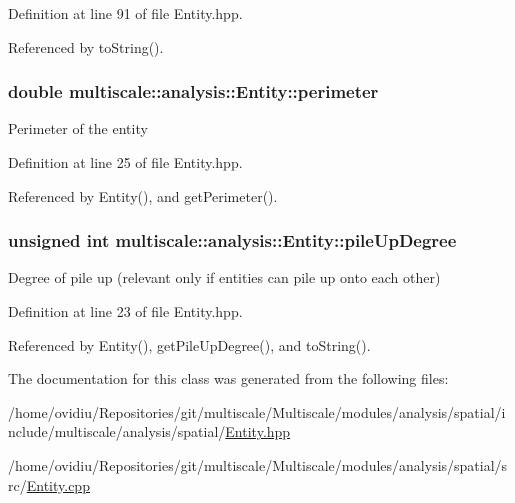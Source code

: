 \-Definition at line 91 of file \-Entity.\-hpp.



\-Referenced by to\-String().

\hypertarget{classmultiscale_1_1analysis_1_1Entity_ac7bcdb1cb5eb4369ca8e44d3dbda44a3}{
\subsubsection[{perimeter}]{\setlength{\rightskip}{0pt plus 5cm}double {\bf multiscale\-::analysis\-::\-Entity\-::perimeter}}}\label{classmultiscale_1_1analysis_1_1Entity_ac7bcdb1cb5eb4369ca8e44d3dbda44a3}
\-Perimeter of the entity 

\-Definition at line 25 of file \-Entity.\-hpp.



\-Referenced by \-Entity(), and get\-Perimeter().

\hypertarget{classmultiscale_1_1analysis_1_1Entity_aae78866cef9fcb7bd2e858570f47d082}{
\subsubsection[{pile\-Up\-Degree}]{\setlength{\rightskip}{0pt plus 5cm}unsigned int {\bf multiscale\-::analysis\-::\-Entity\-::pile\-Up\-Degree}}}\label{classmultiscale_1_1analysis_1_1Entity_aae78866cef9fcb7bd2e858570f47d082}
\-Degree of pile up (relevant only if entities can pile up onto each other) 

\-Definition at line 23 of file \-Entity.\-hpp.



\-Referenced by \-Entity(), get\-Pile\-Up\-Degree(), and to\-String().



\-The documentation for this class was generated from the following files\-:\begin{DoxyCompactItemize}
\item 
/home/ovidiu/\-Repositories/git/multiscale/\-Multiscale/modules/analysis/spatial/include/multiscale/analysis/spatial/\hyperlink{Entity_8hpp}{\-Entity.\-hpp}\item 
/home/ovidiu/\-Repositories/git/multiscale/\-Multiscale/modules/analysis/spatial/src/\hyperlink{Entity_8cpp}{\-Entity.\-cpp}\end{DoxyCompactItemize}
